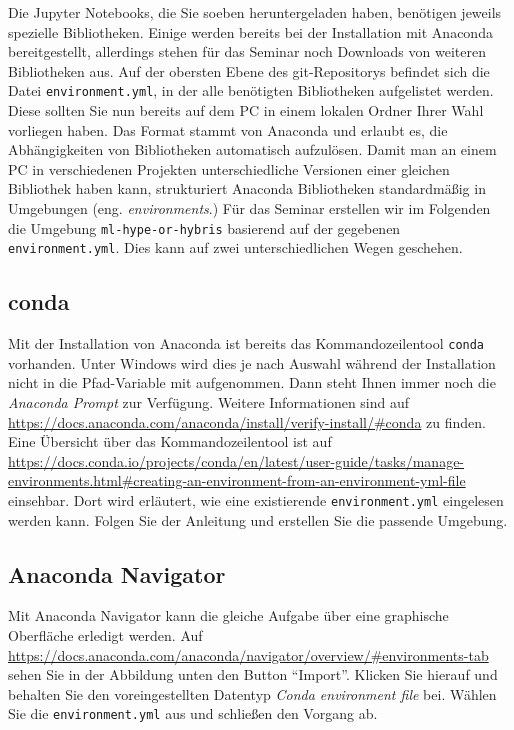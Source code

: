 \documentclass{tufte-handout}
\begin{document}
Die Jupyter Notebooks, die Sie soeben heruntergeladen haben, benötigen jeweils spezielle Bibliotheken.
Einige werden bereits bei der Installation mit Anaconda bereitgestellt, allerdings stehen für das Seminar noch Downloads von weiteren Bibliotheken aus.
Auf der obersten Ebene des git-Repositorys befindet sich die Datei \texttt{environment.yml}, in der alle benötigten Bibliotheken aufgelistet werden.
Diese sollten Sie nun bereits auf dem PC in einem lokalen Ordner Ihrer Wahl vorliegen haben.
Das Format stammt von Anaconda und erlaubt es, die Abhängigkeiten von Bibliotheken automatisch aufzulösen.
Damit man an einem PC in verschiedenen Projekten unterschiedliche Versionen einer gleichen Bibliothek haben kann,
strukturiert Anaconda Bibliotheken standardmäßig in Umgebungen (eng. \emph{environments}.)
Für das Seminar erstellen wir im Folgenden die Umgebung \texttt{ml-hype-or-hybris} basierend auf der gegebenen \texttt{environment.yml}.
Dies kann auf zwei unterschiedlichen Wegen geschehen.

\subsection{conda}

Mit der Installation von Anaconda ist bereits das Kommandozeilentool \texttt{conda} vorhanden.
Unter Windows wird dies je nach Auswahl während der Installation nicht in die Pfad-Variable mit aufgenommen.
Dann steht Ihnen immer noch die \emph{Anaconda Prompt} zur Verfügung.
Weitere Informationen sind auf
\url{https://docs.anaconda.com/anaconda/install/verify-install/#conda}
zu finden.
Eine Übersicht über das Kommandozeilentool ist auf
\url{https://docs.conda.io/projects/conda/en/latest/user-guide/tasks/manage-environments.html#creating-an-environment-from-an-environment-yml-file}
einsehbar.
Dort wird erläutert, wie eine existierende \texttt{environment.yml} eingelesen werden kann.
Folgen Sie der Anleitung und erstellen Sie die passende Umgebung.

\subsection{Anaconda Navigator}

Mit Anaconda Navigator kann die gleiche Aufgabe über eine graphische Oberfläche erledigt werden.
Auf
\url{https://docs.anaconda.com/anaconda/navigator/overview/#environments-tab}
sehen Sie in der Abbildung unten den Button \enquote{Import}.  
Klicken Sie hierauf und behalten Sie den voreingestellten Datentyp \emph{Conda environment file} bei.
Wählen Sie die \texttt{environment.yml} aus und schließen den Vorgang ab.
\end{document}
